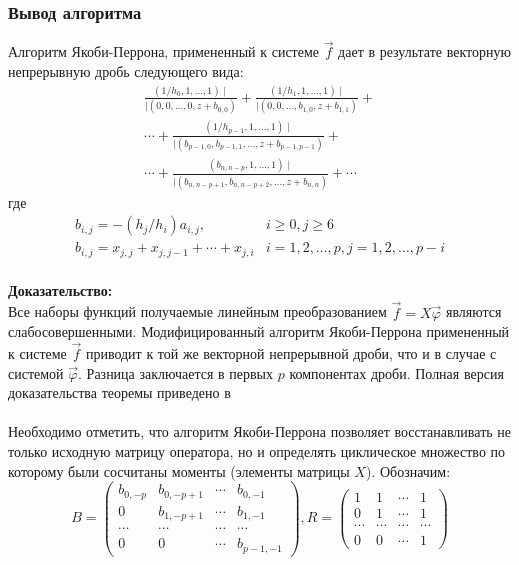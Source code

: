 \subsubsection{Вывод алгоритма}
\begin{teor}
\label{teo_5.1} Алгоритм Якоби-Перрона, примененный к системе
$\overrightarrow{f}$ дает в результате векторную непрерывную дробь
следующего вида:
\begin{eqnarray}
\frac{(1/h_0,1,\ldots,1)\mid}{\mid(0,0,\ldots,0,z+b_{0,0})}+
\frac{(1/h_1,1,\ldots,1)\mid}{\mid(0,0,\ldots,b_{1,0},z+b_{1,1})}+ \nonumber\\
\cdots+\frac{(1/h_{p-1},1,\ldots,1)\mid}{\mid(b_{p-1,0},b_{p-1,1},\ldots,z+b_{p-1,p-1})}+
\nonumber\\
\cdots+\frac{(b_{n,n-p},1,\ldots,1)\mid}{\mid(b_{n,n-p+1},b_{n,n-p+2},\ldots,z+b_{n,n})}+\cdots\nonumber
\end{eqnarray}
где
\begin{equation}
\label{B}
\begin{array}{ll}
b_{i,j}=-(h_j/h_i)a_{i,j}, & i\geq{0},j\geq{6}\\
b_{i,j}=x_{j,j}+x_{j,j-1}+\cdots+x_{j,i} & i=1,2,\ldots,p,j=1,2,\ldots,p-i\\
\end{array}
\end{equation}
\end{teor}
\textbf{Доказательство:} \\
Все наборы функций получаемые линейным преобразованием
$\overrightarrow{f}=X\overrightarrow{\varphi}$ являются
слабосовершенными. Модифицированный алгоритм Якоби-Перрона
примененный к системе $\overrightarrow{f}$ приводит к той же
векторной непрерывной дроби, что и в случае с системой
$\overrightarrow{\varphi}$. Разница заключается в первых $p$
компонентах дроби. Полная версия доказательства теоремы приведено в ~\cite{KaliaguineAA} \\ \\
Необходимо отметить, что алгоритм Якоби-Перрона позволяет
восстанавливать не только исходную матрицу оператора, но и
определять циклическое множество по которому были сосчитаны
моменты (элементы матрицы $X$). Обозначим:
$$%
B=\left(
\begin{array} {cccc}
b_{0,-p} & b_{0,-p+1} & \cdots & b_{0,-1}\\
0        & b_{1,-p+1} & \cdots & b_{1,-1}\\
\cdots   & \cdots     & \cdots & \cdots\\
0        & 0          & \cdots & b_{p-1,-1}
\end{array}
\right), R=\left(
\begin{array}{cccc}
1 & 1 & \cdots & 1\\
0 & 1 & \cdots & 1\\
\cdots & \cdots & \cdots & \cdots\\
0 & 0 & \cdots & 1
\end{array}
\right)
$$%
